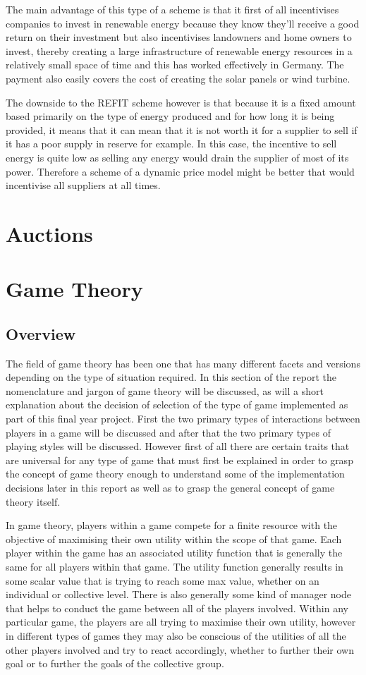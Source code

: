 \documentclass[a4paper, notitlepage]{report}
\begin{document}
The main advantage of this type of a scheme is that it first of all incentivises
companies to invest in renewable energy because they know they'll receive a good
return on their investment but also incentivises landowners and home owners to
invest, thereby creating a large infrastructure of renewable energy resources in
a relatively small space of time and this has worked effectively in Germany. The
payment also easily covers the cost of creating the solar panels or wind
turbine.

The downside to the REFIT scheme however is that because it is a fixed amount
based primarily on the type of energy produced and for how long it is being
provided, it means that it can mean that it is not worth it for a supplier to
sell if it has a poor supply in reserve for example. In this case, the incentive
to sell energy is quite low as selling any energy would drain the supplier of
most of its power. Therefore a scheme of a dynamic price model might be better
that would incentivise all suppliers at all times.
\chapter{Auctions}
\label{sec:org7a8c8d2}
\chapter{Game Theory}
\label{sec:org5f0d041}
\section{Overview}
\label{sec:orgca44493}
The field of game theory has been one that has many different facets and
versions depending on the type of situation required. In this section of the
report the nomenclature and jargon of game theory will be discussed, as will a
short explanation about the decision of selection of the type of game
implemented as part of this final year project. First the two primary types of
interactions between players in a game will be discussed and after that the two
primary types of playing styles will be discussed. However first of all there
are certain traits that are universal for any type of game that must first be
explained in order to grasp the concept of game theory enough to understand some
of the implementation decisions later in this report as well as to grasp the
general concept of game theory itself.

In game theory, players within a game compete for a finite resource with the
objective of maximising their own utility within the scope of that game. Each
player within the game has an associated utility function that is generally the
same for all players within that game. The utility function generally results in
some scalar value that is trying to reach some max value, whether on an
individual or collective level. There is also generally some kind of manager
node that helps to conduct the game between all of the players involved. Within
any particular game, the players are all trying to maximise their own utility,
however in different types of games they may also be conscious of the utilities
of all the other players involved and try to react accordingly, whether to
further their own goal or to further the goals of the collective group.
\end{document}

